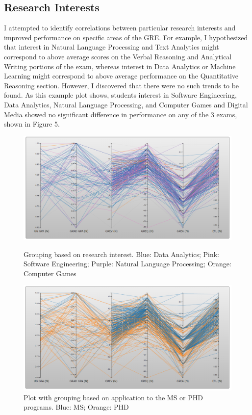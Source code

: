 \documentclass[]{article}
\begin{document}
	\subsection {Research Interests}
		I attempted to identify correlations between particular research interests and improved performance on specific areas of the GRE. For example, I hypothesized that interest in Natural Language Processing and Text Analytics might correspond to above average scores on the Verbal Reasoning and Analytical Writing portions of the exam, whereas interest in Data Analytics or Machine Learning might correspond to above average performance on the Quantitative Reasoning section. However, I discovered that there were no such trends to be found. As this example plot shows, students interest in Software Engineering, Data Analytics, Natural Language Processing, and Computer Games and Digital Media showed no significant difference in performance on any of the 3 exams, shown in Figure 5.
		\begin{figure}[h!]
			\includegraphics[width=\linewidth]{RI.png}
			\caption{Grouping based on research interest. Blue: Data Analytics; Pink: Software Engineering; Purple: Natural Language Processing; Orange: Computer Games}
			\label{fig:RI}
			\includegraphics[width=\linewidth]{ms_phd.png}
			\caption{Plot with grouping based on application to the MS or PHD programs. Blue: MS; Orange: PHD}
			\label{fig:MS_PHD}
		\end{figure}
\end{document}

